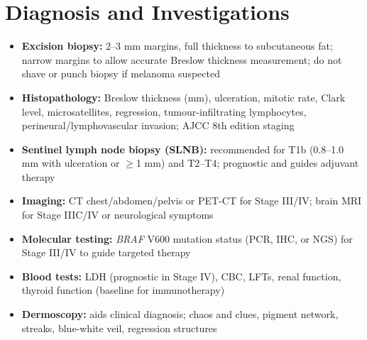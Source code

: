 \section*{Diagnosis and Investigations}
\begin{itemize}
    \item \textbf{Excision biopsy:} 2--3 mm margins, full thickness to subcutaneous fat; narrow margins to allow accurate Breslow thickness measurement; do not shave or punch biopsy if melanoma suspected
    \item \textbf{Histopathology:} Breslow thickness (mm), ulceration, mitotic rate, Clark level, microsatellites, regression, tumour-infiltrating lymphocytes, perineural/lymphovascular invasion; AJCC 8th edition staging
    \item \textbf{Sentinel lymph node biopsy (SLNB):} recommended for T1b (0.8--1.0 mm with ulceration or $\ge$1 mm) and T2--T4; prognostic and guides adjuvant therapy
    \item \textbf{Imaging:} CT chest/abdomen/pelvis or PET-CT for Stage III/IV; brain MRI for Stage IIIC/IV or neurological symptoms
    \item \textbf{Molecular testing:} \textit{BRAF} V600 mutation status (PCR, IHC, or NGS) for Stage III/IV to guide targeted therapy
    \item \textbf{Blood tests:} LDH (prognostic in Stage IV), CBC, LFTs, renal function, thyroid function (baseline for immunotherapy)
    \item \textbf{Dermoscopy:} aids clinical diagnosis; chaos and clues, pigment network, streaks, blue-white veil, regression structures
\end{itemize}

